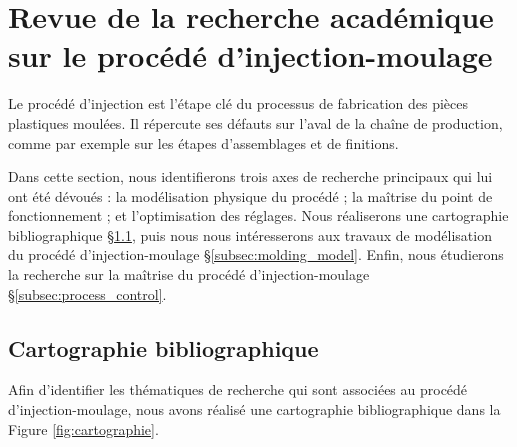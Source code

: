 \newpage
\section{Revue de la recherche académique sur le procédé d'injection-moulage}  \label{sec:research_topics}
Le procédé d'injection est l'étape clé du processus de fabrication des pièces plastiques moulées.
Il répercute ses défauts sur l'aval de la chaîne de production, comme par exemple sur les étapes d'assemblages et de finitions.

Dans cette section, nous identifierons trois axes de recherche principaux qui lui ont été dévoués : la modélisation physique du procédé ; la maîtrise du point de fonctionnement ; et l'optimisation des réglages.
Nous réaliserons une cartographie bibliographique §\ref{subsec:injection_research}, puis nous nous intéresserons aux travaux de modélisation du procédé d'injection-moulage §\ref{subsec:molding_model}.
Enfin, nous étudierons la recherche sur la maîtrise du procédé d'injection-moulage §\ref{subsec:process_control}.

\subsection{Cartographie bibliographique} \label{subsec:injection_research}
Afin d'identifier les thématiques de recherche qui sont associées au procédé d'injection-moulage, nous avons réalisé une cartographie bibliographique dans la Figure \ref{fig:cartographie}.

